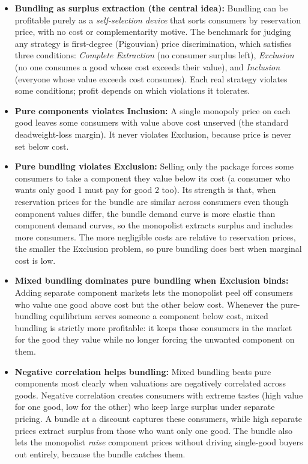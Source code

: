 \documentclass[12pt]{article}
\begin{document}
\begin{itemize}
    \begin{itemize}
      \item \textbf{Bundling as surplus extraction (the central idea):} Bundling can be profitable purely as a \textit{self-selection device} that sorts consumers by reservation price, with no cost or complementarity motive. The benchmark for judging any strategy is first-degree (Pigouvian) price discrimination, which satisfies three conditions: \textit{Complete Extraction} (no consumer surplus left), \textit{Exclusion} (no one consumes a good whose cost exceeds their value), and \textit{Inclusion} (everyone whose value exceeds cost consumes). Each real strategy violates some conditions; profit depends on which violations it tolerates.
      \item \textbf{Pure components violates Inclusion:} A single monopoly price on each good leaves some consumers with value above cost unserved (the standard deadweight-loss margin). It never violates Exclusion, because price is never set below cost.
      \item \textbf{Pure bundling violates Exclusion:} Selling only the package forces some consumers to take a component they value below its cost (a consumer who wants only good 1 must pay for good 2 too). Its strength is that, when reservation prices for the bundle are similar across consumers even though component values differ, the bundle demand curve is more elastic than component demand curves, so the monopolist extracts surplus and includes more consumers. The more negligible costs are relative to reservation prices, the smaller the Exclusion problem, so pure bundling does best when marginal cost is low.
      \item \textbf{Mixed bundling dominates pure bundling when Exclusion binds:} Adding separate component markets lets the monopolist peel off consumers who value one good above cost but the other below cost. Whenever the pure-bundling equilibrium serves someone a component below cost, mixed bundling is strictly more profitable: it keeps those consumers in the market for the good they value while no longer forcing the unwanted component on them.
      \item \textbf{Negative correlation helps bundling:} Mixed bundling beats pure components most clearly when valuations are negatively correlated across goods. Negative correlation creates consumers with extreme tastes (high value for one good, low for the other) who keep large surplus under separate pricing. A bundle at a discount captures these consumers, while high separate prices extract surplus from those who want only one good. The bundle also lets the monopolist \textit{raise} component prices without driving single-good buyers out entirely, because the bundle catches them.

\end{itemize}
\end{itemize}
\end{document}

